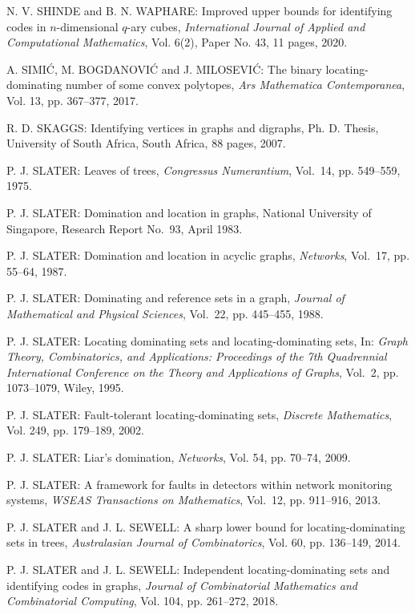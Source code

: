 \begin{thebibliography}{999}
N. V. SHINDE and B. N. WAPHARE: Improved upper bounds for identifying codes in $n$-dimensional $q$-ary cubes, {\it International Journal of Applied and Computational Mathematics}, Vol. 6(2), Paper No. 43, 11 pages, 2020.

A. SIMI\'C, M. BOGDANOVI\'C and J. MILOSEVI\'C: The binary locating-dominating number of some convex polytopes, {\it Ars Mathematica Contemporanea}, Vol. 13, pp. 367--377, 2017.    

R. D. SKAGGS: Identifying vertices in graphs and digraphs, Ph. D. Thesis, University of South Africa, South Africa, 88 pages, 2007.

P. J. SLATER: Leaves of trees, {\it Congressus Numerantium}, Vol.~14, pp. 549--559, 1975.

P. J. SLATER: Domination and location in graphs, National University of Singapore, Research Report No.~93, April 1983.

P. J. SLATER: Domination and location in acyclic graphs, {\it Networks}, Vol.~17, pp. 55--64, 1987.

P. J. SLATER: Dominating and reference sets in a graph, {\it Journal of Mathematical and Physical Sciences}, Vol.~22, pp. 445--455, 1988.

P. J. SLATER: Locating dominating sets and locating-dominating sets, In: {\it Graph Theory, Combinatorics, and Applications: Proceedings of the 7th Quadrennial International Conference on the Theory and Applications of Graphs}, Vol.~2, pp. 1073--1079, Wiley, 1995.

P. J. SLATER: Fault-tolerant locating-dominating sets, {\it Discrete Mathematics}, Vol. 249, pp. 179--189, 2002.

P. J. SLATER: Liar's domination, {\it Networks}, Vol. 54, pp. 70--74, 2009.

P. J. SLATER: A framework for faults in detectors within network monitoring systems, {\it WSEAS Transactions on Mathematics}, Vol.~12, pp. 911--916, 2013.

P. J. SLATER and J. L. SEWELL: A sharp lower bound for locating-dominating sets in trees, {\it Australasian Journal of Combinatorics}, Vol. 60, pp. 136--149, 2014.

P. J. SLATER and J. L. SEWELL: Independent locating-dominating sets and identifying codes in graphs, {\it Journal of Combinatorial Mathematics and Combinatorial Computing}, Vol. 104, pp. 261--272, 2018.


\end{thebibliography}
